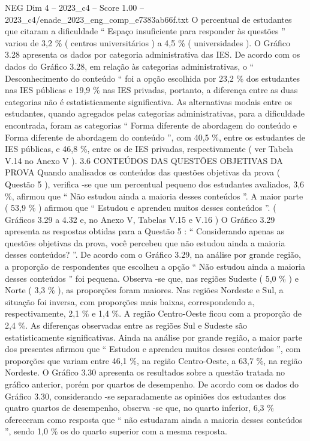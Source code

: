 \begin{textsample}{NEG Dim 4 – 2023\_c4 – Score 1.00 – 2023\_c4/enade\_2023\_eng\_comp\_e7383ab66f.txt}
O percentual de estudantes que citaram a dificuldade “ Espaço insuficiente para responder às questões ” variou de 3,2 \% ( centros universitários ) a 4,5 \% ( universidades ).
O Gráfico 3.28 apresenta os dados por categoria administrativa das IES.
De acordo com os dados do Gráfico 3.28, em relação às categorias administrativas, o “ Desconhecimento do conteúdo “ foi a opção escolhida por 23,2 \% dos estudantes nas IES públicas e 19,9 \% nas IES privadas, portanto, a diferença entre as duas categorias não é estatisticamente significativa.
As alternativas modais entre os estudantes, quando agregados pelas categorias administrativas, para a dificuldade encontrada, foram as categorias “ Forma diferente de abordagem do conteúdo e Forma diferente de abordagem do conteúdo ”, com 40,5 \%, entre os estudantes de IES públicas, e 46,8 \%, entre os de IES privadas, respectivamente ( ver Tabela V.14 no Anexo V ). 3.6 CONTEÚDOS DAS QUESTÕES OBJETIVAS DA PROVA Quando analisados os conteúdos das questões objetivas da prova ( Questão 5 ), verifica -se que um percentual pequeno dos estudantes avaliados, 3,6 \%, afirmou que “ Não estudou ainda a maioria desses conteúdos ”.
A maior parte ( 53,9 \% ) afirmou que “ Estudou e aprendeu muitos desses conteúdos ”. ( Gráficos 3.29 a 4.32 e, no Anexo V, Tabelas V.15 e V.16 ) O Gráfico 3.29 apresenta as respostas obtidas para a Questão 5 : “ Considerando apenas as questões objetivas da prova, você percebeu que não estudou ainda a maioria desses conteúdos? ”.
De acordo com o Gráfico 3.29, na análise por grande região, a proporção de respondentes que escolheu a opção “ Não estudou ainda a maioria desses conteúdos ” foi pequena.
Observa -se que, nas regiões Sudeste ( 5,0 \% ) e Norte ( 3,3 \% ), as proporções foram maiores.
Nas regiões Nordeste e Sul, a situação foi inversa, com proporções mais baixas, correspondendo a, respectivamente, 2,1 \% e 1,4 \%.
A região Centro-Oeste ficou com a proporção de 2,4 \%.
As diferenças observadas entre as regiões Sul e Sudeste são estatisticamente significativas.
Ainda na análise por grande região, a maior parte dos presentes afirmou que “ Estudou e aprendeu muitos desses conteúdos ”, com proporções que variam entre 46,1 \%, na região Centro-Oeste, a 63,7 \%, na região Nordeste.
O Gráfico 3.30 apresenta os resultados sobre a questão tratada no gráfico anterior, porém por quartos de desempenho.
De acordo com os dados do Gráfico 3.30, considerando -se separadamente as opiniões dos estudantes dos quatro quartos de desempenho, observa -se que, no quarto inferior, 6,3 \% ofereceram como resposta que “ não estudaram ainda a maioria desses conteúdos ”, sendo 1,0 \% os do quarto superior com a mesma resposta.

\end{textsample}
